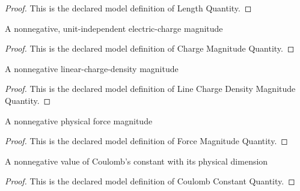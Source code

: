 \begin{proof}
  This is the declared model definition of Length Quantity.
\end{proof}
\begin{definition}
  \label{def:physics:phyx-mini-0839:phyxminiproblems-problemphyxmini0839-chargemagnitudequantity}
  A nonnegative, unit-independent electric-charge magnitude
\end{definition}
\begin{proof}
  This is the declared model definition of Charge Magnitude Quantity.
\end{proof}
\begin{definition}
  \label{def:physics:phyx-mini-0839:phyxminiproblems-problemphyxmini0839-linechargedensitymagnitudequantity}
  A nonnegative linear-charge-density magnitude
\end{definition}
\begin{proof}
  This is the declared model definition of Line Charge Density Magnitude Quantity.
\end{proof}
\begin{definition}
  \label{def:physics:phyx-mini-0839:phyxminiproblems-problemphyxmini0839-forcemagnitudequantity}
  A nonnegative physical force magnitude
\end{definition}
\begin{proof}
  This is the declared model definition of Force Magnitude Quantity.
\end{proof}
\begin{definition}
  \label{def:physics:phyx-mini-0839:phyxminiproblems-problemphyxmini0839-coulombconstantquantity}
  A nonnegative value of Coulomb's constant with its physical dimension
\end{definition}
\begin{proof}
  This is the declared model definition of Coulomb Constant Quantity.
\end{proof}
